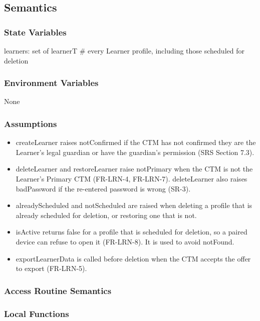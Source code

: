 \documentclass[12pt, titlepage]{article}
\begin{document}
\subsection{Semantics}

\subsubsection{State Variables}

learners: set of learnerT \# every Learner profile, including those scheduled
for deletion

\subsubsection{Environment Variables}

None

\subsubsection{Assumptions}

\begin{itemize}
\item createLearner raises notConfirmed if the CTM has not confirmed they are
  the Learner's legal guardian or have the guardian's permission (SRS
  Section 7.3).
\item deleteLearner and restoreLearner raise notPrimary when the CTM is not the
  Learner's Primary CTM (FR-LRN-4, FR-LRN-7). deleteLearner also raises
  badPassword if the re-entered password is wrong (SR-3).
\item alreadyScheduled and notScheduled are raised when deleting a profile that
  is already scheduled for deletion, or restoring one that is not.
\item isActive returns false for a profile that is scheduled for deletion, so a
  paired device can refuse to open it (FR-LRN-8). It is used to avoid notFound.
\item exportLearnerData is called before deletion when the CTM accepts the offer
  to export (FR-LRN-5).
\end{itemize}

\subsubsection{Access Routine Semantics}

\subsubsection{Local Functions}
\end{document}
